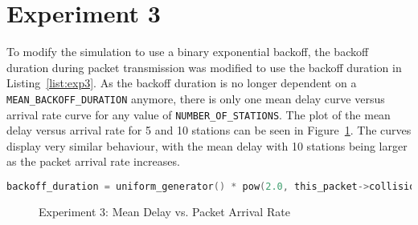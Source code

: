 \section*{Experiment 3}
To modify the simulation to use a binary exponential backoff, the backoff duration during packet transmission was modified to use the backoff duration in Listing~\ref{list:exp3}. As the backoff duration is no longer dependent on a \texttt{MEAN\_BACKOFF\_DURATION} anymore, there is only one mean delay curve versus arrival rate curve for any value of \texttt{NUMBER\_OF\_STATIONS}. The plot of the mean delay versus arrival rate for 5 and 10 stations can be seen in Figure~\ref{fig:exp3}. The curves display very similar behaviour, with the mean delay with 10 stations being larger as the packet arrival rate increases.

\begin{lstlisting}[language=c,caption=Binary Exponential Backoff, label=list:exp3]
backoff_duration = uniform_generator() * pow(2.0, this_packet->collision_count);
\end{lstlisting}

\begin{figure}[htp]
\centering
{}
\caption{Experiment 3: Mean Delay vs. Packet Arrival Rate}
\label{fig:exp3}
\end{figure}